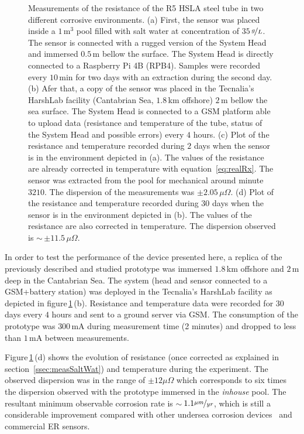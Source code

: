 \documentclass[journal,twoside,web]{ieeecolor}
\begin{document}
\begin{figure}
\caption{Measurements of the resistance of the R5 HSLA steel tube in two different corrosive environments. (a) First, the sensor was placed inside a $1$\,m$^{3}$ pool filled with salt water at concentration of $35$\,$\nicefrac{g}{L}$. The sensor is connected with a rugged version of the System Head and immersed $0.5$\,m bellow the surface. The System Head is directly connected to a Raspberry Pi 4B (RPB4). Samples were recorded every $10$\,min for two days with an extraction during the second day. (b) Afer that, a copy of the sensor was placed in the Tecnalia's HarshLab facility (Cantabrian Sea, $1.8$\,km offshore) $2$\,m bellow the sea surface. The System Head is connected to a GSM platform able to upload data (resistance and temperature of the tube, status of the System Head and possible errors) every $4$ hours. (c) Plot of the resistance and temperature recorded during $2$ days when the sensor is in the environment depicted in (a). The values of the resistance are already corrected in temperature with equation~\ref{eq:realRx}. The sensor was extracted from the pool for mechanical around minute $3210$. The dispersion of the measurements was $\pm2.05$\,$\mu\Omega$. (d) Plot of the resistance and temperature recorded during $30$ days when the sensor is in the environment depicted in (b). The values of the resistance are also corrected in temperature. The dispersion observed is $\sim$\,$\pm11.5$\,$\mu\Omega$.}
\label{fig:poolMeas}
\end{figure}

In order to test the performance of the device presented here, a replica of the previously described and studied prototype was immersed $1.8$\,km offshore and $2$\,m deep in the Cantabrian Sea. The system (head and sensor connected to a GSM+battery station) was deployed in the Tecnalia's HarshLab facility as depicted in figure\,\ref{fig:poolMeas}\,(b). Resistance and temperature data were recorded for $30$ days every $4$ hours and sent to a ground server via GSM. The consumption of the prototype was $300$\,mA during measurement time (2 minutes) and dropped to less than $1$\,mA between measurements.

Figure\,\ref{fig:poolMeas}\,(d) shows the evolution of resistance (once corrected as explained in section~\ref{ssec:measSaltWat}) and temperature during the experiment. The observed dispersion was in the range of $\pm12\mu\Omega$ which corresponds to six times the dispersion observed with the prototype immersed in the \textit{inhouse} pool. The resultant minimum observable corrosion rate is $\sim$\,$1.1\nicefrac{\mu m}{yr}$, which is still a considerable improvement compared with other undersea corrosion devices~\cite{Yang2008} and commercial ER sensors. 
\end{document}
